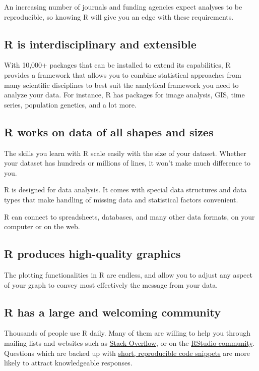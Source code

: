 \documentclass[]{book}
\begin{document}
An increasing number of journals and funding agencies expect analyses to
be reproducible, so knowing R will give you an edge with these
requirements.

\subsection{R is interdisciplinary and
extensible}\label{r-is-interdisciplinary-and-extensible}

With 10,000+ packages that can be installed to extend its capabilities,
R provides a framework that allows you to combine statistical approaches
from many scientific disciplines to best suit the analytical framework
you need to analyze your data. For instance, R has packages for image
analysis, GIS, time series, population genetics, and a lot more.

\subsection{R works on data of all shapes and
sizes}\label{r-works-on-data-of-all-shapes-and-sizes}

The skills you learn with R scale easily with the size of your dataset.
Whether your dataset has hundreds or millions of lines, it won't make
much difference to you.

R is designed for data analysis. It comes with special data structures
and data types that make handling of missing data and statistical
factors convenient.

R can connect to spreadsheets, databases, and many other data formats,
on your computer or on the web.

\subsection{R produces high-quality
graphics}\label{r-produces-high-quality-graphics}

The plotting functionalities in R are endless, and allow you to adjust
any aspect of your graph to convey most effectively the message from
your data.

\subsection{R has a large and welcoming
community}\label{r-has-a-large-and-welcoming-community}

Thousands of people use R daily. Many of them are willing to help you
through mailing lists and websites such as
\href{https://stackoverflow.com/}{Stack Overflow}, or on the
\href{https://community.rstudio.com/}{RStudio community}. Questions
which are backed up with \href{https://www.tidyverse.org/help/}{short,
reproducible code snippets} are more likely to attract knowledgeable
responses.
\end{document}
